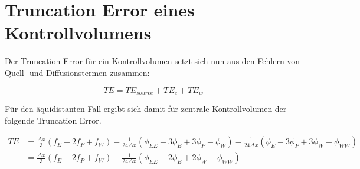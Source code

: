 \documentclass[10pt, ngerman,colorback,accentcolor=tud2d]{tudreport}
\begin{document}
\section{Truncation Error eines Kontrollvolumens}
\label{sec:Truncation Error eines Kontrollvolumens}

Der Truncation Error für ein Kontrollvolumen setzt sich nun aus den Fehlern von Quell-
und Diffusionstermen zusammen:

\begin{equation*}
  TE = TE_{source} + TE_e + TE_w
\end{equation*}

Für den äquidistanten Fall ergibt sich damit für zentrale Kontrollvolumen der folgende
Truncation Error.

\begin{align}
  TE &= \frac{\Delta x}{3} \left({f_E-2f_P+f_W}\right)
   -\frac{1}{24\Delta x}\left({
\phi_{EE}-3\phi_E+3\phi_P-\phi_W}\right)
  -\frac{1}{24 \Delta x}\left({
\phi_E-3\phi_P+3\phi_W-\phi_{WW}}\right)\\
&=  \frac{\Delta x}{3} \left({f_E-2f_P+f_W}\right)
-\frac{1}{24\Delta x} \left({
\phi_{EE}-2\phi_E+2\phi_W-\phi_{WW}}\right)
\end{align}
\end{document}
